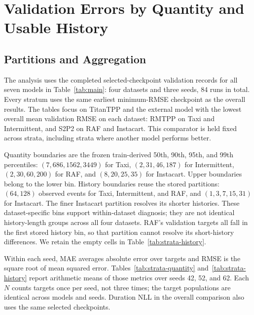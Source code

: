 \documentclass[runningheads]{llncs}
\begin{document}
\section{Validation Errors by Quantity and Usable History}\label{app:strata}
\subsection{Partitions and Aggregation}
The analysis uses the completed selected-checkpoint validation records for
all seven models in Table~\ref{tab:main}: four datasets and three seeds,
84 runs in total. Every stratum uses the same earliest minimum-RMSE
checkpoint as the overall results. The tables focus on TitanTPP and the
external model with the lowest overall mean validation RMSE on each dataset:
RMTPP on Taxi and Intermittent, and S2P2 on RAF and Instacart. This comparator
is held fixed across strata, including strata where another model performs
better.

Quantity boundaries are the frozen train-derived 50th, 90th, 95th, and
99th percentiles: $(7,686,1562,3449)$ for Taxi, $(2,31,46,187)$ for
Intermittent, $(2,30,60,200)$ for RAF, and $(8,20,25,35)$ for Instacart.
Upper boundaries belong to the lower bin. History boundaries reuse the
stored partitions: $(64,128)$ observed events for Taxi, Intermittent, and
RAF, and $(1,3,7,15,31)$ for Instacart. The finer Instacart partition
resolves its shorter histories. These dataset-specific bins support
within-dataset diagnosis; they are not identical history-length groups
across all four datasets. RAF's validation targets all fall in the first
stored history bin, so that partition cannot resolve its short-history
differences. We retain the empty cells in Table~\ref{tab:strata-history}.

Within each seed, MAE averages absolute error over targets and RMSE is the
square root of mean squared error. Tables~\ref{tab:strata-quantity}
and~\ref{tab:strata-history} report arithmetic means of those metrics over
seeds 42, 52, and 62. Each $N$ counts targets once per seed, not three times;
the target populations are identical across models and seeds. Duration NLL
in the overall comparison also uses the same selected checkpoints.
\end{document}
